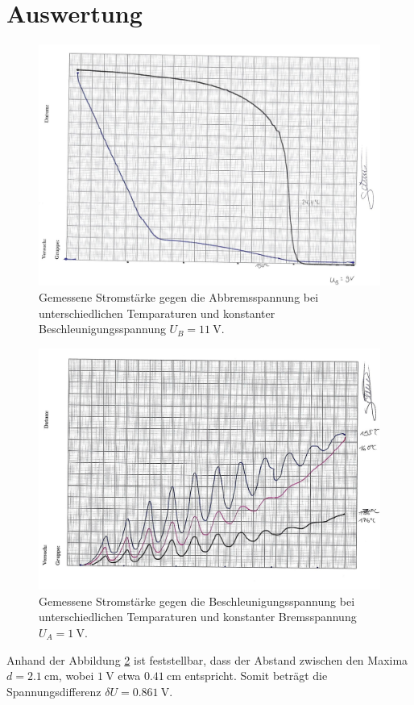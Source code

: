 \section{Auswertung}
\label{sec:Auswertung}

\begin{figure}
    \includegraphics{Bilder/1.jpg}
    \caption{Gemessene Stromstärke gegen die Abbremsspannung bei unterschiedlichen Temparaturen und konstanter Beschleunigungsspannung
    $U_B=\qty{11}{\volt}$.}
    \label{fig:1}
\end{figure}

\begin{figure}
    \includegraphics{Bilder/2.jpg}
    \caption{Gemessene Stromstärke gegen die Beschleunigungsspannung bei unterschiedlichen Temparaturen und konstanter Bremsspannung
    $U_A=\qty{1}{\volt}$.}
    \label{fig:2}
\end{figure}

Anhand der Abbildung \ref{fig:2} ist feststellbar, dass der Abstand zwischen den Maxima $d=\qty{2.1}{\centi\meter}$, 
wobei $\qty{1}{\volt}$ etwa $\qty{0.41}{\centi\meter}$ entspricht. Somit beträgt die Spannungsdifferenz $\delta U=\qty{0.861}{\volt}$.

